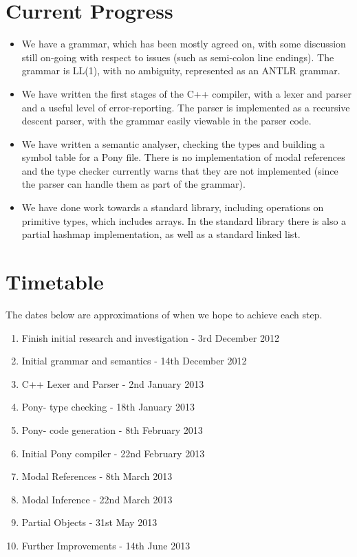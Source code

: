 \documentclass[11pt,a4paper]{report}
\begin{document}
\section{Current Progress}

\begin{itemize}
\item We have a grammar, which has been mostly agreed on, with some discussion still on-going with respect to issues (such as semi-colon line endings).
	The grammar is LL(1), with no ambiguity, represented as an ANTLR grammar. 
\item We have written the first stages of the C++ compiler, with a lexer and parser and a useful level of error-reporting.
	The parser is implemented as a recursive descent parser, with the grammar easily viewable in the parser code.
\item We have written a semantic analyser, checking the types and building a symbol table for a Pony file.
	There is no implementation of modal references and the type checker currently warns that they are not implemented (since the parser can handle them as part of the grammar).
\item We have done work towards a standard library, including operations on primitive types, which includes arrays.
	In the standard library there is also a partial hashmap implementation, as well as a standard linked list.
\end{itemize}

\section{Timetable}

The dates below are approximations of when we hope to achieve each step.

\begin{enumerate}[noitemsep]
	\item Finish initial research and investigation - 3rd December 2012
	\item Initial grammar and semantics - 14th December 2012
	\item C++ Lexer and Parser - 2nd January 2013
	\item Pony- type checking - 18th January 2013
	\item Pony- code generation - 8th February 2013
	\item Initial Pony compiler - 22nd February 2013
	\item Modal References - 8th March 2013
	\item Modal Inference - 22nd March 2013
	\item Partial Objects - 31st May 2013
	\item Further Improvements - 14th June 2013
\end{enumerate}
\end{document}
